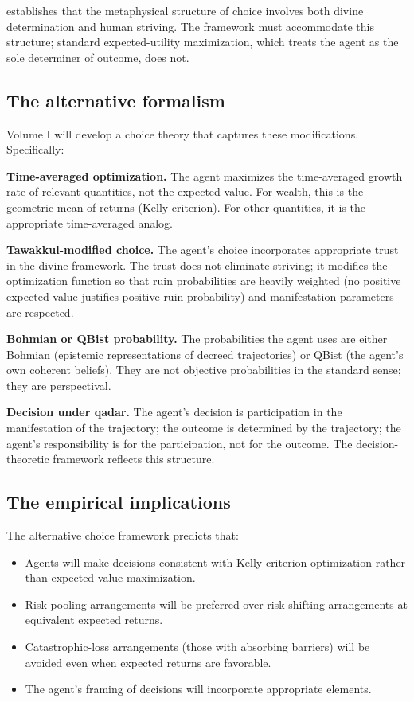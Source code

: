  establishes that the metaphysical structure of
choice involves both divine determination and human striving.
The framework must accommodate this structure; standard expected-utility
maximization, which treats the agent as the sole determiner of
outcome, does not.

\subsection{The alternative formalism}

Volume I will develop a choice theory that captures these
modifications. Specifically:

\textbf{Time-averaged optimization.} The agent maximizes the
time-averaged growth rate of relevant quantities, not the
expected value. For wealth, this is the geometric mean of returns
(Kelly criterion). For other quantities, it is the appropriate
time-averaged analog.

\textbf{Tawakkul-modified choice.} The agent's choice incorporates
appropriate trust in the divine framework. The trust does not
eliminate striving; it modifies the optimization function so
that ruin probabilities are heavily weighted (no positive
expected value justifies positive ruin probability) and
manifestation parameters are respected.

\textbf{Bohmian or QBist probability.} The probabilities the
agent uses are either Bohmian (epistemic representations of
decreed trajectories) or QBist (the agent's own coherent
beliefs). They are not objective probabilities in the standard
sense; they are perspectival.

\textbf{Decision under qadar.} The agent's decision is
participation in the manifestation of the trajectory; the
outcome is determined by the trajectory; the agent's
responsibility is for the participation, not for the outcome.
The decision-theoretic framework reflects this structure.

\subsection{The empirical implications}

The alternative choice framework predicts that:

\begin{itemize}[leftmargin=2em]
    \item Agents will make decisions consistent with Kelly-criterion
    optimization rather than expected-value maximization.
    \item Risk-pooling arrangements will be preferred over
    risk-shifting arrangements at equivalent expected returns.
    \item Catastrophic-loss arrangements (those with absorbing
    barriers) will be avoided even when expected returns are
    favorable.
    \item The agent's framing of decisions will incorporate
    appropriate  elements.
\end{itemize}

